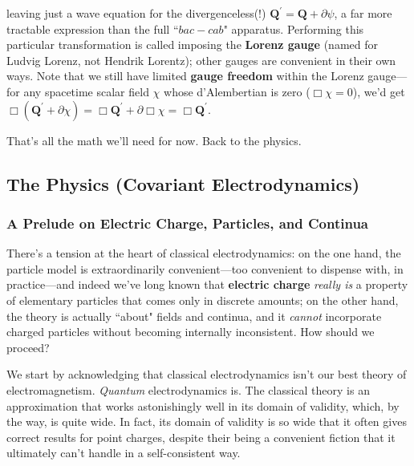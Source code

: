 \documentclass[12pt]{article}
\renewcommand{\vv}[1]{\mathbf{#1}}
\begin{document}
leaving just a wave equation for the divergenceless(!) $\vv Q^\prime = \vv Q + \partialup \psi$, a far more tractable expression than the full ``$bac - cab$" apparatus. Performing this particular transformation is called imposing the \textbf{Lorenz gauge} (named for Ludvig Lorenz, not Hendrik Lorentz); other gauges are convenient in their own ways. Note that we still have limited \textbf{gauge freedom} within the Lorenz gauge---for any spacetime scalar field $\chi$ whose d'Alembertian is zero (${\Box \chi = 0}$), we'd get $\Box ( \vv Q^\prime + \partialup \chi ) = \Box \vv Q^\prime + \partialup \Box \chi = \Box \vv Q^\prime$.

That's all the math we'll need for now. Back to the physics.



\subsection{The Physics (Covariant Electrodynamics)}

\subsubsection{A Prelude on Electric Charge, Particles, and Continua}\label{sssec:prelude}

There's a tension at the heart of classical electrodynamics: on the one hand, the particle model is extraordinarily convenient---too convenient to dispense with, in practice---and indeed we've long known that \textbf{electric charge} \emph{really is} a property of elementary particles that comes only in discrete amounts; on the other hand, the theory is actually ``about" fields and continua, and it \emph{cannot} incorporate charged particles without becoming internally inconsistent. How should we proceed?

We start by acknowledging that classical electrodynamics isn't our best theory of electromagnetism. \emph{Quantum} electrodynamics is. The classical theory is an approximation that works astonishingly well in its domain of validity, which, by the way, is quite wide. In fact, its domain of validity is so wide that it often gives correct results for point charges, despite their being a convenient fiction that it ultimately can't handle in a self-consistent way.
\end{document}

